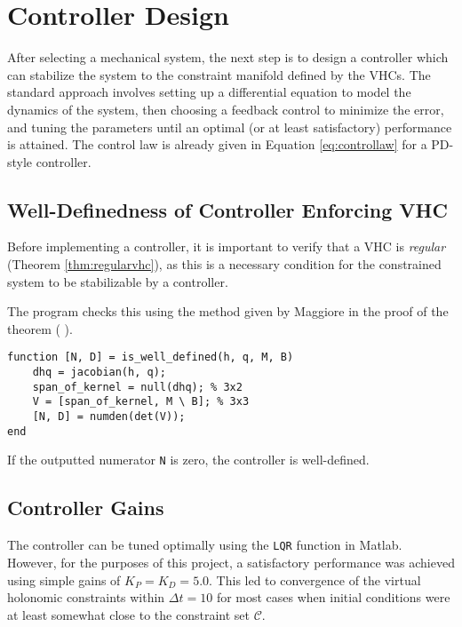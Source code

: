 \documentclass[main.tex]{subfiles}
\begin{document}




\section{Controller Design}
After selecting a mechanical system, the next step is to design a controller which can stabilize the system to the constraint manifold defined by the VHCs. 
The standard approach involves setting up a differential equation to model the dynamics of the system, then choosing a feedback control to minimize the error, and tuning the parameters until an optimal (or at least satisfactory) performance is attained\cite{franklin2002feedback}. The control law is already given in Equation \ref{eq:controllaw} for a PD-style controller.
\subsection{Well-Definedness of Controller Enforcing VHC}
Before implementing a controller, it is important to verify that a VHC is \textit{regular} (Theorem \ref{thm:regularvhc}), as this is a necessary condition for the constrained system to be stabilizable by a controller.

The program checks this using the method given by Maggiore in the proof of the theorem ( \cite[Prop. 3.2]{maggiore2012virtual}).
\begin{lstlisting}
function [N, D] = is_well_defined(h, q, M, B)
    dhq = jacobian(h, q);
    span_of_kernel = null(dhq); % 3x2
    V = [span_of_kernel, M \ B]; % 3x3
    [N, D] = numden(det(V));
end
\end{lstlisting}
If the outputted numerator \verb|N| is zero, the controller is well-defined.
\subsection{Controller Gains}
The controller can be tuned optimally using the \verb|LQR| function in Matlab. However, for the purposes of this project, a satisfactory performance was achieved using simple gains of $K_P=K_D=5.0$. This led to convergence of the virtual holonomic constraints within $\Delta t=10$ for most cases when initial conditions were at least somewhat close to the constraint set $\mathcal{C}$.
\end{document}
